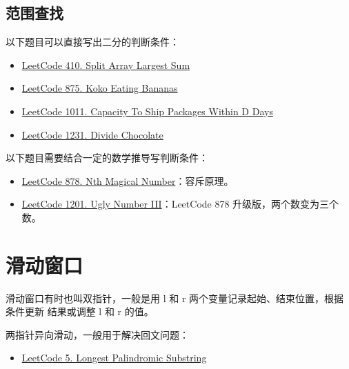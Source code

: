 \subsection{范围查找}
以下题目可以直接写出二分的判断条件：

\begin{itemize}
  \label{lc:bs-range-general}
  \item
    \href{https://leetcode.com/problems/split-array-largest-sum/}{LeetCode 410. Split Array Largest Sum}
  \item
    \href{https://leetcode.com/problems/koko-eating-bananas/}{LeetCode 875. Koko Eating Bananas}
  \item
    \href{https://leetcode.com/problems/capacity-to-ship-packages-within-d-days/}{LeetCode
      1011. Capacity To Ship Packages Within D Days}
  \item
    \href{https://leetcode.com/problems/divide-chocolate}{LeetCode 1231. Divide Chocolate}
\end{itemize}

以下题目需要结合一定的数学推导写判断条件：

\begin{itemize}
  \label{lc:bs-range-math}
  \item
    \href{https://leetcode.com/problems/nth-magical-number/}{LeetCode 878. Nth
      Magical Number}：容斥原理。
  \item
    \href{https://leetcode.com/problems/ugly-number-iii/}{LeetCode 1201. Ugly
      Number III}：LeetCode 878 升级版，两个数变为三个数。

\end{itemize}

\section{滑动窗口}

滑动窗口有时也叫双指针，一般是用 l 和 r 两个变量记录起始、结束位置，根据条件更新
结果或调整 l 和 r 的值。

两指针异向滑动，一般用于解决回文问题：
\begin{itemize}
  \item
    \href{https://leetcode.com/problems/longest-palindromic-substring/}{LeetCode
    5. Longest Palindromic Substring}
\end{itemize}

